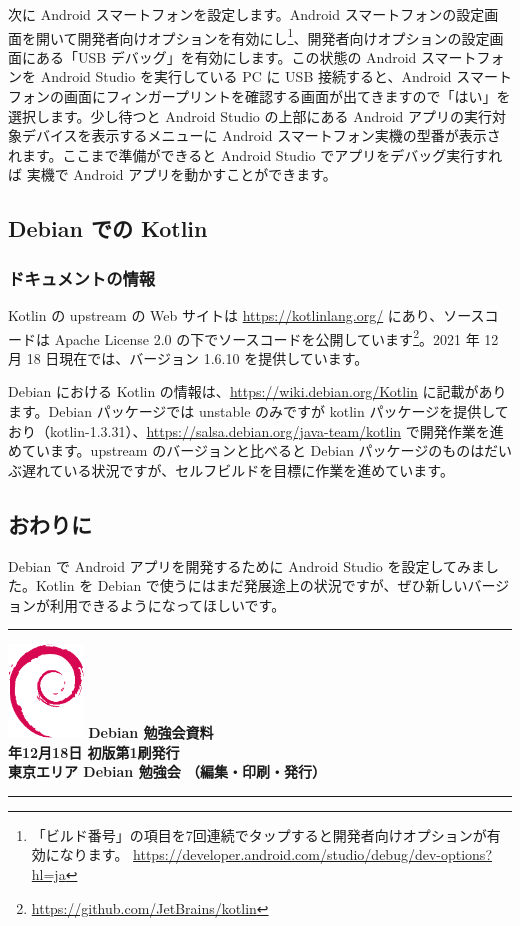 \documentclass[mingoth,a4paper]{jsarticle}
\newcommand{\debmtgyear}{2021}
\newcommand{\debmtgmonth}{12}
\newcommand{\debmtgdate}{18}
\begin{document}
次に Android スマートフォンを設定します。Android スマートフォンの設定画面を開いて開発者向けオプションを有効にし\footnote{「ビルド番号」の項目を7回連続でタップすると開発者向けオプションが有効になります。 \url{https://developer.android.com/studio/debug/dev-options?hl=ja}}、開発者向けオプションの設定画面にある「USB デバッグ」を有効にします。この状態の Android スマートフォンを Android Studio を実行している PC に USB 接続すると、Android スマートフォンの画面にフィンガープリントを確認する画面が出てきますので「はい」を選択します。少し待つと Android Studio の上部にある Android アプリの実行対象デバイスを表示するメニューに Android スマートフォン実機の型番が表示されます。ここまで準備ができると Android Studio でアプリをデバッグ実行すれば 実機で Android アプリを動かすことができます。


\subsection{Debian での Kotlin}

\subsubsection{ドキュメントの情報}

Kotlin の upstream の Web サイトは \url{https://kotlinlang.org/} にあり、ソースコードは Apache License 2.0 の下でソースコードを公開しています\footnote{\url{https://github.com/JetBrains/kotlin}}。2021 年 12 月 18 日現在では、バージョン 1.6.10 を提供しています。

Debian における Kotlin の情報は、\url{https://wiki.debian.org/Kotlin} に記載があります。Debian パッケージでは unstable のみですが  kotlin パッケージを提供しており（kotlin-1.3.31）、\url{https://salsa.debian.org/java-team/kotlin} で開発作業を進めています。upstream のバージョンと比べると Debian パッケージのものはだいぶ遅れている状況ですが、セルフビルドを目標に作業を進めています。


\subsection{おわりに}

Debian で Android アプリを開発するために Android Studio を設定してみました。Kotlin を Debian で使うにはまだ発展途上の状況ですが、ぜひ新しいバージョンが利用できるようになってほしいです。


\mbox{}\newpage

\vspace*{15cm}
\hrule
\vspace{2mm}
\includegraphics[width=2cm]{image-assets/openlogo-nd.eps}
\noindent \Large \bf Debian 勉強会資料\\
\noindent \normalfont \debmtgyear{}年\debmtgmonth{}月\debmtgdate{}日 \hspace{5mm}  初版第1刷発行\\
\noindent \normalfont 東京エリア Debian 勉強会 （編集・印刷・発行）\\
\hrule
\end{document}
